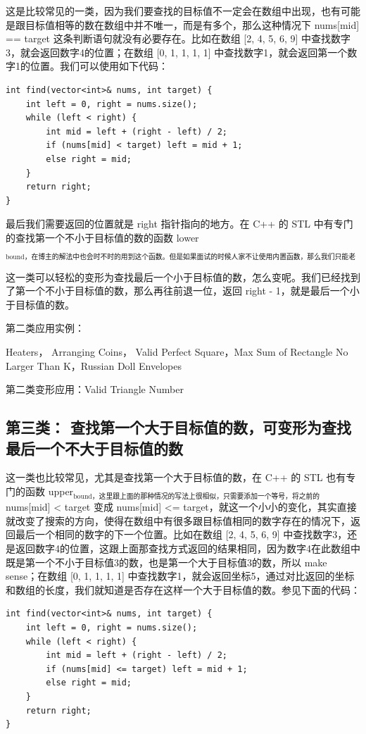 \documentclass[9pt, b5paaper]{book}
\begin{document}
这是比较常见的一类，因为我们要查找的目标值不一定会在数组中出现，也有可能是跟目标值相等的数在数组中并不唯一，而是有多个，那么这种情况下 nums[mid] == target 这条判断语句就没有必要存在。比如在数组 [2, 4, 5, 6, 9] 中查找数字3，就会返回数字4的位置；在数组 [0, 1, 1, 1, 1] 中查找数字1，就会返回第一个数字1的位置。我们可以使用如下代码：
\begin{verbatim}
int find(vector<int>& nums, int target) {
    int left = 0, right = nums.size();
    while (left < right) {
        int mid = left + (right - left) / 2;
        if (nums[mid] < target) left = mid + 1;
        else right = mid;
    }
    return right;
}
\end{verbatim}

最后我们需要返回的位置就是 right 指针指向的地方。在 C++ 的 STL 中有专门的查找第一个不小于目标值的数的函数 lower$_{\text{bound，在博主的解法中也会时不时的用到这个函数。但是如果面试的时候人家不让使用内置函数，那么我们只能老老实实写上面这段二分查找的函数。}}$

这一类可以轻松的变形为查找最后一个小于目标值的数，怎么变呢。我们已经找到了第一个不小于目标值的数，那么再往前退一位，返回 right - 1，就是最后一个小于目标值的数。

第二类应用实例：

Heaters， Arranging Coins， Valid Perfect Square，Max Sum of Rectangle No Larger Than K，Russian Doll Envelopes

第二类变形应用：Valid Triangle Number

\subsection{第三类： 查找第一个大于目标值的数，可变形为查找最后一个不大于目标值的数}
\label{sec-5-1-8}

这一类也比较常见，尤其是查找第一个大于目标值的数，在 C++ 的 STL 也有专门的函数 upper$_{\text{bound，这里跟上面的那种情况的写法上很相似，只需要添加一个等号，将之前的}}$ nums[mid] < target 变成 nums[mid] <= target，就这一个小小的变化，其实直接就改变了搜索的方向，使得在数组中有很多跟目标值相同的数字存在的情况下，返回最后一个相同的数字的下一个位置。比如在数组 [2, 4, 5, 6, 9] 中查找数字3，还是返回数字4的位置，这跟上面那查找方式返回的结果相同，因为数字4在此数组中既是第一个不小于目标值3的数，也是第一个大于目标值3的数，所以 make sense；在数组 [0, 1, 1, 1, 1] 中查找数字1，就会返回坐标5，通过对比返回的坐标和数组的长度，我们就知道是否存在这样一个大于目标值的数。参见下面的代码：
\begin{verbatim}
int find(vector<int>& nums, int target) {
    int left = 0, right = nums.size();
    while (left < right) {
        int mid = left + (right - left) / 2;
        if (nums[mid] <= target) left = mid + 1;
        else right = mid;
    }
    return right;
}
\end{verbatim}
\end{document}
